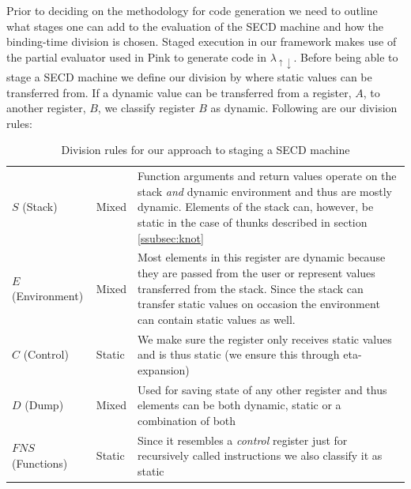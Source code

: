 \documentclass[a4paper,12pt,twoside,openright]{report}
\theoremstyle{definition}
\newcommand{\mslang}{$\lambda_{\uparrow\downarrow}$}
\begin{document}
Prior to deciding on the methodology for code generation we need to outline what stages one can add to the evaluation of the SECD machine and how the binding-time division is chosen. Staged execution in our framework makes use of the partial evaluator used in Pink \cite{amin2017collapsing} to generate code in \mslang. Before being able to stage a SECD machine we define our division by where static values can be transferred from. If a dynamic value can be transferred from a register, $A$, to another register, $B$, we classify register $B$ as dynamic. Following are our division rules:

\begin{table}[!htbp]
  \centering
  \begin{tabular}{|p{3cm}|p{3cm}|p{6cm}|}
 	\hline
 	\thead{SECD Register}	&	\thead{Classification}	&	\thead{Reason}	\\ \hline
	$S$ (Stack)				&	Mixed				&	Function arguments and return values operate on the stack \textit{and} dynamic environment and thus are mostly dynamic. Elements of the stack can, however, be static in the case of thunks described in section \ref{ssubsec:knot} \\ \hline

	$E$ (Environment)		&	Mixed			&	 Most elements in this register are dynamic because they are passed from the user or represent values transferred from the stack. Since the stack can transfer static values on occasion the environment can contain static values as well. \\ \hline

	$C$ (Control)				&	Static				& We make sure the register only receives static values and is thus static (we ensure this through eta-expansion)  \\ \hline

	$D$ (Dump)				&	Mixed				&	Used for saving state of any other register and thus elements can be both dynamic, static or a combination of both \\ \hline

	$FNS$ (Functions)		&	Static				&	Since it resembles a \textit{control} register just for recursively called instructions we also classify it as static \\

	\hline
  \end{tabular}
  \caption{Division rules for our approach to staging a SECD machine}
  \label{tbl:secd_division}
\end{table}
\end{document}
